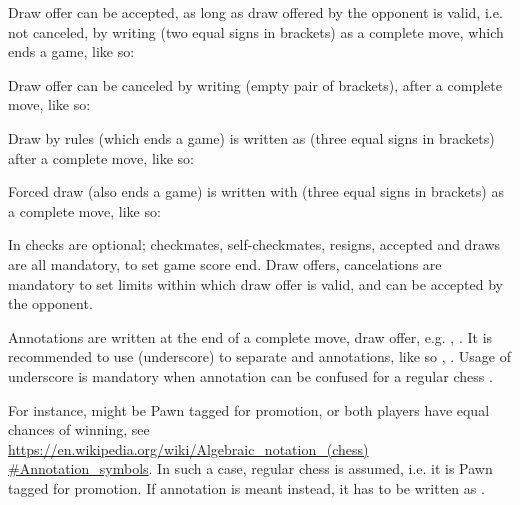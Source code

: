 \algcycpar
{}
\algcycparend

Draw offer can be accepted, as long as draw offered by the opponent is valid, i.e. not
canceled, by writing \alg{(==)} (two equal signs in brackets) as a complete move, which
ends a game, like so:

\algcycpar
{}
\algcycparend

Draw offer can be canceled by writing \alg{()} (empty pair of brackets), after a complete
move, like so:

\algcycpar
{}
\algcycparend

Draw by rules (which ends a game) is written as \alg{(===)} (three equal signs in
brackets) after a complete move, like so:

\algcycpar
{}
\algcycparend

Forced draw (also ends a game) is written with \alg{(===)} (three equal signs in
brackets) as a complete move, like so:

\algcycpar
{}
\algcycparend

In  checks are optional; checkmates, self-checkmates, resigns, accepted
and draws are all mandatory, to set game score end. Draw offers, cancelations are
mandatory to set limits within which draw offer is valid, and can be accepted by
the opponent.

Annotations are written at the end of a complete move, draw offer, e.g. ,
. It is recommended to use \alg{\_} (underscore) to separate 
and annotations, like so , . Usage of underscore is
mandatory when annotation can be confused for a regular chess . %

For instance,  might be Pawn tagged for promotion, or both players have equal
chances of winning, see\newline
\href{https://en.wikipedia.org/wiki/Algebraic\_notation\_(chess)#Annotation\_symbols}
{https://en.wikipedia.org/wiki/Algebraic\_notation\_(chess)\newline
\#Annotation\_symbols}. In such a case, regular chess  is assumed, i.e. it
is Pawn tagged for promotion. If annotation is meant instead, it has to be written as
.

